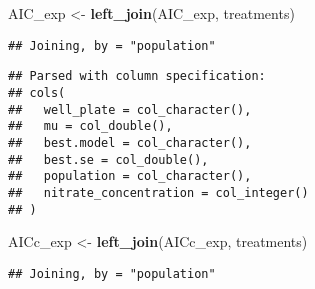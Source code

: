\documentclass[]{article}
\newenvironment{Shaded}{\begin{snugshade}}{\end{snugshade}}
\newcommand{\KeywordTok}[1]{\textcolor[rgb]{0.13,0.29,0.53}{\textbf{{#1}}}}
\newcommand{\DataTypeTok}[1]{\textcolor[rgb]{0.13,0.29,0.53}{{#1}}}
\newcommand{\DecValTok}[1]{\textcolor[rgb]{0.00,0.00,0.81}{{#1}}}
\newcommand{\StringTok}[1]{\textcolor[rgb]{0.31,0.60,0.02}{{#1}}}
\newcommand{\NormalTok}[1]{{#1}}
\begin{document}
\begin{Shaded}
\begin{Highlighting}[]
\NormalTok{AIC_exp <-}\StringTok{ }\KeywordTok{left_join}\NormalTok{(AIC_exp, treatments)}
\end{Highlighting}
\end{Shaded}

\begin{verbatim}
## Joining, by = "population"
\end{verbatim}

\begin{Shaded}
\end{Shaded}

\begin{verbatim}
## Parsed with column specification:
## cols(
##   well_plate = col_character(),
##   mu = col_double(),
##   best.model = col_character(),
##   best.se = col_double(),
##   population = col_character(),
##   nitrate_concentration = col_integer()
## )
\end{verbatim}

\begin{Shaded}
\begin{Highlighting}[]
\NormalTok{AICc_exp <-}\StringTok{ }\KeywordTok{left_join}\NormalTok{(AICc_exp, treatments)}
\end{Highlighting}
\end{Shaded}

\begin{verbatim}
## Joining, by = "population"
\end{verbatim}

\begin{Shaded}
\end{Shaded}
\end{document}
